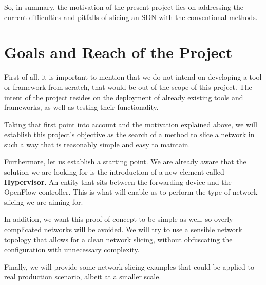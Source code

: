 So, in summary, the motivation of the present project lies on addressing the current difficulties and pitfalls of slicing an SDN with the conventional methods.

\section{Goals and Reach of the Project}

First of all, it is important to mention that we do not intend on developing a tool or framework from scratch, that would be out of the scope of this project. The intent of the project resides on the deployment of already existing tools and frameworks, as well as testing their functionality.

Taking that first point into account and the motivation explained above, we will establish this project's objective as the search of a method to slice a network in such a way that is reasonably simple and easy to maintain. 

Furthermore, let us establish a starting point. We are already aware that the solution we are looking for is the introduction of a new element called \textbf{Hypervisor}. An entity that sits between the forwarding device and the OpenFlow controller. This is what will enable us to perform the type of network slicing we are aiming for.

In addition, we want this proof of concept to be simple as well, so overly complicated networks will be avoided. We will try to use a sensible network topology that allows for a clean network slicing, without obfuscating the configuration with unnecessary complexity.

Finally, we will provide some network slicing examples that could be applied to real production scenario, albeit at a smaller scale.

